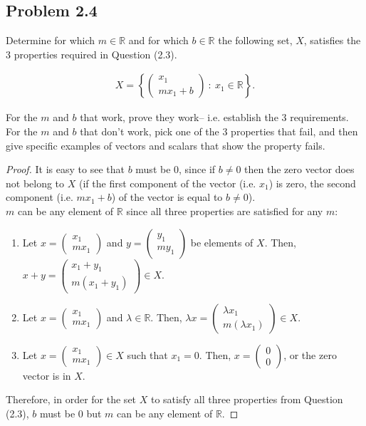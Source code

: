 \subsection*{Problem 2.4}
Determine for which $m\in\mathbb{R}$ and for which $b\in\mathbb{R}$ the following set, $X$, satisfies the 3 properties required in Question (2.3).
	
	\begin{align*}
		X = \left\{  \begin{pmatrix}x_1\\mx_1+b\end{pmatrix}\ :\ x_1\in\mathbb{R}   \right\}.
	\end{align*}
	
	For the $m$ and $b$ that work, prove they work-- i.e. establish the 3 requirements.  For the $m$ and $b$ that don't work, pick one of the 3 properties that fail, and then give specific examples of vectors and scalars that show the property fails.
\renewcommand\qedsymbol{}
\renewcommand*{\proofname}{Solution}
\begin{proof}
    It is easy to see that $b$ must be 0, since if $b\not=0$ then the zero vector does not belong to $X$ (if the first component of the vector (i.e. $x_1$) is zero, the second component (i.e. $mx_1+b$) of the vector is equal to $b\not=0$).\\
    $m$ can be any element of $\mathbb{R}$ since all three properties are satisfied for any $m$:
    \begin{enumerate}[(1)]
        \item Let $x=\begin{pmatrix}x_1\\mx_1\end{pmatrix}$ and $y=\begin{pmatrix}y_1\\my_1\end{pmatrix}$ be elements of $X$. Then, $x+y=\begin{pmatrix}x_1+y_1\\m(x_1+y_1)\end{pmatrix}\in X$.
        \item Let $x=\begin{pmatrix}x_1\\mx_1\end{pmatrix}$ and $\lambda\in\mathbb{R}$. Then, $\lambda x=\begin{pmatrix}\lambda x_1\\m(\lambda x_1)\end{pmatrix}\in X$.
        \item Let $x=\begin{pmatrix}x_1\\mx_1\end{pmatrix}\in X$ such that $x_1=0$. Then, $x=\begin{pmatrix}0\\0\end{pmatrix}$, or the zero vector is in $X$.
    \end{enumerate}
    Therefore, in order for the set $X$ to satisfy all three properties from Question (2.3), $b$ must be 0 but $m$ can be any element of $\mathbb{R}$.
\end{proof}
